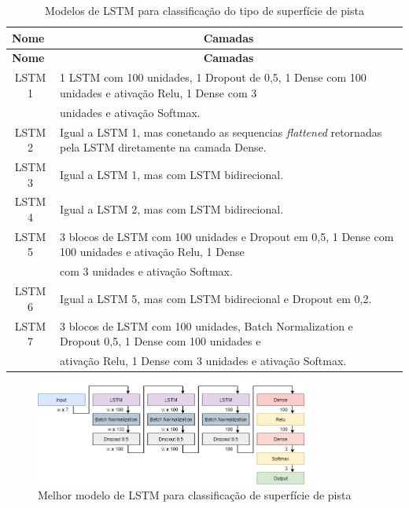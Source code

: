 \begin{center}
\scriptsize
\begin{longtable}{cl}
\caption{Modelos de LSTM para classificação do tipo de superfície de pista}
\label{table:lstm_superficie_pista_1} \\
\toprule 
\multicolumn{1}{l}{\textbf{Nome}} & 
\multicolumn{1}{c}{\textbf{Camadas}} \\ \midrule
\endfirsthead
\toprule 
\multicolumn{1}{l}{\textbf{Nome}} & 
\multicolumn{1}{c}{\textbf{Camadas}} \\ \midrule
\endhead \endfoot \endlastfoot
LSTM 1 & 1 LSTM com 100 unidades, 1 Dropout de 0,5, 1 Dense com 100 unidades e ativação Relu,  1 Dense com 3 \\ & unidades e  ativação Softmax. \\ \midrule
LSTM 2 & Igual a LSTM 1, mas conetando as sequencias \textit{flattened} retornadas pela LSTM diretamente na camada Dense. \\ \midrule
LSTM 3 & Igual a LSTM 1, mas com LSTM bidirecional. \\ \midrule
LSTM 4 & Igual a LSTM 2, mas com LSTM bidirecional. \\ \midrule
LSTM 5 & 3 blocos de LSTM com 100 unidades e Dropout em 0,5, 1 Dense com 100 unidades e ativação Relu, 1 Dense \\ & com 3  unidades e ativação Softmax.\\ \midrule
LSTM 6 & Igual a LSTM 5, mas com LSTM bidirecional e Dropout em 0,2. \\ \midrule
LSTM 7 & 3 blocos de LSTM com 100 unidades, Batch Normalization e Dropout 0,5, 1 Dense com 100 unidades e \\ & ativação Relu, 1 Dense com 3 unidades e ativação Softmax. \\ \bottomrule
\end{longtable}
\end{center}

\begin{figure}[h]
  \centering
  \caption{Melhor modelo de LSTM para classificação de superfície de pista}
  \label{fig:best_lstm_tipo_superficie_1}
  \includegraphics[width=0.8\textwidth]{figuras/fig_31.png}
\end{figure}

